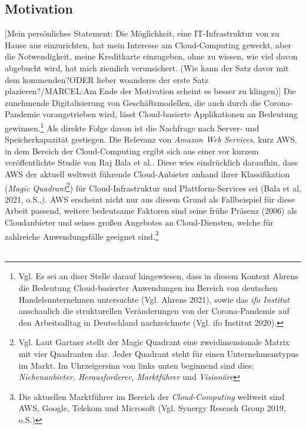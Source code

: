 \subsection{Motivation}
[Mein persönliches Statement: Die Möglichkeit, eine IT-Infrastruktur von zu Hause aus einzurichten, hat mein Interesse am Cloud-Computing geweckt, aber die Notwendigkeit, meine Kreditkarte einzugeben, ohne zu wissen, wie viel davon abgebucht wird, hat mich ziemlich verunsichert. (Wie kann der Satz davor mit dem kommenden?ODER lieber woanderes der erste Satz plazieren?/MARCEL:Am Ende der Motivation scheint es besser zu klingen)] Die zunehmende Digitalisierung von Geschäftsmodellen, die auch durch die Corona-Pandemie vorangetrieben wird, lässt Cloud-basierte Applikationen an Bedeutung gewinnen.\footnote{Vgl. Es sei an diser Stelle darauf hingewiesen, dass in diesem Kontext Ahrens die Bedeutung Cloud-basierter Anwendungen im Bereich von deutschen Handelsunternehmen untersuchte (Vgl. Ahrens 2021)\cite{STA3}, sowie das \textit{ifo Institut} anschaulich die strukturellen Veränderungen von der Corona-Pandemie auf den Arbeitsalltag in Deutschland nachzeichnete (Vgl. ifo Institut 2020)\cite{STA2}.} Als direkte Folge davon ist die Nachfrage nach Server- und Speicherkapazität gestiegen.
Die Relevanz von \textit{Amazon Web Services}, kurz AWS, in dem Bereich der Cloud-Computing ergibt sich aus einer vor kurzem veröffentlichte Studie von Raj Bala et al.. Diese wies eindrücklich daraufhin, dass AWS der aktuell weltweit führende Cloud-Anbieter anhand ihrer Klassifikation (\textit{Magic Quadrant}\footnote{Vgl.  Laut Gartner stellt der Magic Quadrant eine zweidimensionale Matrix mit vier Quadranten dar. Jeder Quadrant steht für einen Unternehmenstypus im Markt. Im Uhrzeigersinn von links unten beginnend sind dies: \textit{Nichenanbieter, Herausforderer, Marktführer }und \textit{Visionäre}}) für Cloud-Infrastruktur und Plattform-Services sei (Bala et al, 2021, o.S.,\cite{G01}).
AWS erscheint nicht nur aus diesem Grund als Fallbeispiel für diese Arbeit passend, weitere bedeutsame Faktoren sind seine frühe Präsenz (2006) als Cloudanbieter und seines großen Angebotes an Cloud-Diensten, welche für zahlreiche Anwendungsfälle geeignet sind.\footnote{Die aktuellen Marktführer im Bereich der \textit{Cloud-Computing} weltweit sind AWS, Google, Telekom und Microsoft (Vgl. Synergy Reseach Group 2019, o.S.\cite{STA6})}
\\\\

